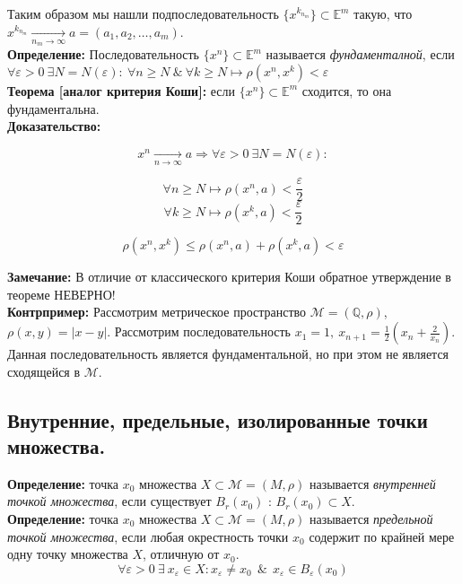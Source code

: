 \documentclass[a4paper,12pt]{article} %
\begin{document}
\noindent Таким образом мы нашли подпоследовательность $\{x^{k_{n_m}} \} \subset \mathbb{E}^m$ такую, что $x^{k_{n_m}} \xrightarrow[n_m \to \infty]{} a = (a_1, a_2, \dots, a_m)$.\\

\noindent \textbf{Определение:} Последовательность $\{x^n \} \subset \mathbb{E}^m$ называется \textit{фундаменталной}, если $\forall \varepsilon > 0 ~ \exists N = N(\varepsilon) : ~ \forall n \geqslant N ~ \& ~ \forall k \geqslant N \mapsto \rho(x^n, x^k) < \varepsilon$\\

\noindent \textbf{Теорема [аналог критерия Коши]:} если $\{x^n \} \subset \mathbb{E}^m$ сходится, то она фундаментальна.\\

\noindent \textbf{Доказательство:}

\[ x^n \xrightarrow[n \to \infty]{} a \Rightarrow \forall \varepsilon > 0 ~ \exists N = N(\varepsilon) : \]

\[ \forall n \geqslant N \mapsto \rho(x^n, a) < \frac{\varepsilon}{2} \]
\[ \forall k \geqslant N \mapsto \rho(x^k, a) < \frac{\varepsilon}{2} \]

\[ \rho(x^n, x^k) \leqslant \rho(x^n, a) + \rho(x^k, a) < \varepsilon \]

\noindent \textbf{Замечание:} В отличие от классического критерия Коши обратное утверждение в теореме НЕВЕРНО!\\

\noindent \textbf{Контрпример:} Рассмотрим метрическое пространство $\mathscr{M} = (\mathbb{Q}, \rho)$, $\rho(x, y) = |x - y|$. Рассмотрим последовательность $x_1 = 1, ~ x_{n + 1} = \frac{1}{2}(x_n + \frac{2}{x_n})$. Данная последовательность является фундаментальной, но при этом не является сходящейся в $\mathscr{M}$.

\subsection*{Внутренние, предельные, изолированные точки множества.}

\noindent \textbf{Определение:} точка $x_0$ множества $X \subset \mathscr{M} = (M, \rho)$ называется \textit{внутренней точкой множества}, если существует $B_{r}(x_0)$ : $B_{r}(x_0) \subset X$.\\

\noindent \textbf{Определение:} точка $x_0$ множества $X \subset \mathscr{M} = (M, \rho)$ называется \textit{предельной точкой множества}, если любая окрестность точки $x_0$ содержит по крайней мере одну точку множества $X$, отличную от $x_0$.
\[ \forall \varepsilon > 0 ~ \exists ~ x_{\varepsilon} \in X : x_{\varepsilon} \neq x_0 ~~ \& ~~ x_{\varepsilon} \in B_{\varepsilon}(x_0) \]
\end{document}
